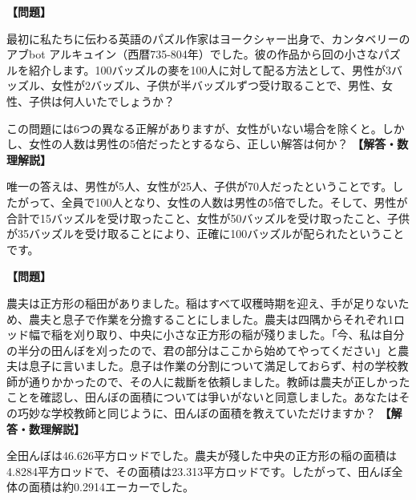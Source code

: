 \documentclass[10pt,a4paper,oneside,openany]{ltjsbook}
\begin{document}
\begin{tcolorbox}[colback=softblue,colframe=primaryblue,title=\textbf{第 110 問：Abbott のパズル （原題: THE ABBOT'S PUZZLE.）},arc=2mm,boxrule=1pt,breakable]
\textbf{【問題】}\par\vspace{0.3em}
最初に私たちに伝わる英語のパズル作家はヨークシャー出身で、カンタベリーのアブbot アルキュイン（西暦735-804年）でした。彼の作品から回の小さなパズルを紹介します。100バッズルの麥を100人に対して配る方法として、男性が3バッズル、女性が2バッズル、子供が半バッズルずつ受け取ることで、男性、女性、子供は何人いたでしょうか？

この問題には6つの異なる正解がありますが、女性がいない場合を除くと。しかし、女性の人数は男性の5倍だったとするなら、正しい解答は何か？
\tcblower
\textbf{【解答・数理解説】}\par\vspace{0.3em}
唯一の答えは、男性が5人、女性が25人、子供が70人だったということです。したがって、全員で100人となり、女性の人数は男性の5倍でした。そして、男性が合計で15バッズルを受け取ったこと、女性が50バッズルを受け取ったこと、子供が35バッズルを受け取ることにより、正確に100バッズルが配られたということです。
\end{tcolorbox}

\begin{tcolorbox}[colback=softblue,colframe=primaryblue,title=\textbf{第 111 問：稲刈りの問題 （原題: REAPING THE CORN.）},arc=2mm,boxrule=1pt,breakable]
\textbf{【問題】}\par\vspace{0.3em}
農夫は正方形の稲田がありました。稲はすべて収穫時期を迎え、手が足りないため、農夫と息子で作業を分擔することにしました。農夫は四隅からそれぞれ1ロッド幅で稲を刈り取り、中央に小さな正方形の稲が殘りました。「今、私は自分の半分の田んぼを刈ったので、君の部分はここから始めてやってください」と農夫は息子に言いました。息子は作業の分割について満足しておらず、村の学校教師が通りかかったので、その人に裁斷を依頼しました。教師は農夫が正しかったことを確認し、田んぼの面積については爭いがないと同意しました。あなたはその巧妙な学校教師と同じように、田んぼの面積を教えていただけますか？
\tcblower
\textbf{【解答・数理解説】}\par\vspace{0.3em}
全田んぼは46.626平方ロッドでした。農夫が殘した中央の正方形の稲の面積は4.8284平方ロッドで、その面積は23.313平方ロッドです。したがって、田んぼ全体の面積は約0.2914エーカーでした。
\end{tcolorbox}
\end{document}
